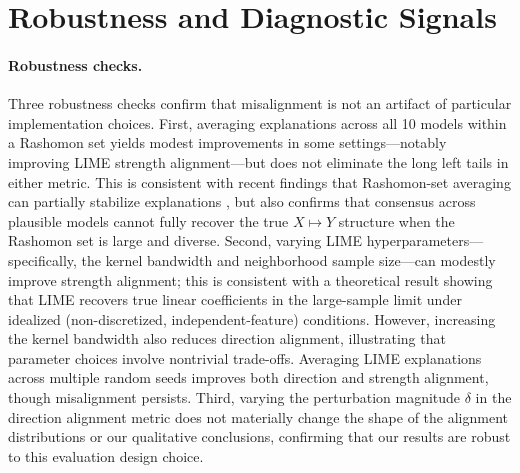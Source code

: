 \documentclass[11pt]{article}
\begin{document}
\section{Robustness and Diagnostic Signals}

\paragraph{Robustness checks.}
Three robustness checks confirm that misalignment is not an artifact of particular implementation choices. First, averaging explanations across all 10 models within a Rashomon set yields modest improvements in some settings---notably improving LIME strength alignment---but does not eliminate the long left tails in either metric. This is consistent with recent findings that Rashomon-set averaging can partially stabilize explanations \citep{donnelly2023rashomon}, but also confirms that consensus across plausible models cannot fully recover the true $X \mapsto Y$ structure when the Rashomon set is large and diverse. Second, varying LIME hyperparameters---specifically, the kernel bandwidth and neighborhood sample size---can modestly improve strength alignment; this is consistent with a theoretical result showing that LIME recovers true linear coefficients in the large-sample limit under idealized (non-discretized, independent-feature) conditions. However, increasing the kernel bandwidth also reduces direction alignment, illustrating that parameter choices involve nontrivial trade-offs. Averaging LIME explanations across multiple random seeds improves both direction and strength alignment, though misalignment persists. Third, varying the perturbation magnitude $\delta$ in the direction alignment metric does not materially change the shape of the alignment distributions or our qualitative conclusions, confirming that our results are robust to this evaluation design choice.
\end{document}
